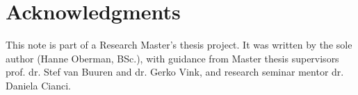 \documentclass[article]{jss}
\begin{document}
\section*{Acknowledgments}

This note is part of a Research Master's thesis project. It was written by the sole author (Hanne Oberman, BSc.), with guidance from Master thesis supervisors prof. dr. Stef van Buuren and dr. Gerko Vink, and research seminar mentor dr. Daniela Cianci. 






% 
% 
% 

\end{document}
